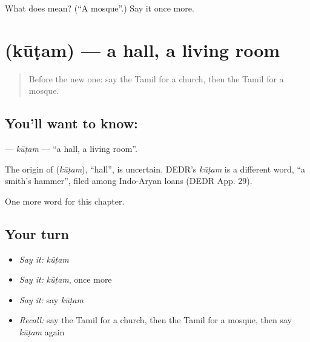 \begin{tcolorbox}[breakable,colback=teal!4,colframe=teal!35!black,title={Before you move on}]
What does  mean? (\textquotedblleft{}A mosque\textquotedblright{}.) Say it once more.
\end{tcolorbox}
\section[\texorpdfstring{\ta{கூடம்} (kūṭam)}{கூடம் (kūṭam)}]{ (kūṭam) — a hall, a living room}

\label{lesson:TA-C206-kutam}



\begin{quote}
Before the new one: say the Tamil for a church, then the Tamil for a mosque.
\end{quote}

\subsection*{You'll want to know: }
\textbf{} — \emph{kūṭam} — \textquotedblleft{}a hall, a living room\textquotedblright{}.

\begin{cousinweb}
The origin of \textbf{} (\emph{kūṭam}), \textquotedblleft{}hall\textquotedblright{}, is uncertain. DEDR's \emph{kūṭam} is a different word, \textquotedblleft{}a smith's hammer\textquotedblright{}, filed among Indo-Aryan loans (DEDR App. 29).
\end{cousinweb}

\begin{grammarlens}[title={What you've built}]
One more word for this chapter.
\end{grammarlens}

\subsection*{Your turn}
\begin{itemize}
\raggedright
  \item \emph{Say it:} \emph{kūṭam}
  \item \emph{Say it:} \emph{kūṭam}, once more
  \item \emph{Say it:} say \emph{kūṭam}
  \item \emph{Recall:} say the Tamil for a church, then the Tamil for a mosque, then say \emph{kūṭam} again
\end{itemize}

